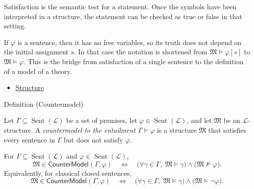 \begin{remark*}[Interpretation]
Satisfaction is the semantic test for a statement. Once the symbols have been
interpreted in a structure, the statement can be checked as true or false in
that setting.
\end{remark*}

\begin{remark*}[Exposition]
If $\varphi$ is a sentence, then it has no free variables, so its truth does
not depend on the initial assignment $s$. In that case the notation is
shortened from $\mathfrak{M}\vDash\varphi[s]$ to $\mathfrak{M}\vDash\varphi$.
This is the bridge from satisfaction of a single sentence to the definition of
a model of a theory.
\end{remark*}

\begin{dependencies}
\begin{itemize}
  \item \hyperref[def:axiom-systems-structure]{Structure}
\end{itemize}
\end{dependencies}

\begin{definitionbox}{Definition (Countermodel)}
\begin{definition}[Countermodel]
\label{def:axiom-systems-countermodel}
Let $\Gamma\subseteq\operatorname{Sent}(\mathcal{L})$ be a set of premises,
let $\varphi\in\operatorname{Sent}(\mathcal{L})$, and let $\mathfrak{M}$ be
an $\mathcal{L}$-structure. A \emph{countermodel to the entailment
$\Gamma\vDash\varphi$} is a structure $\mathfrak{M}$ that satisfies every
sentence in $\Gamma$ but does not satisfy $\varphi$.
\end{definition}
\end{definitionbox}
\begin{remark*}
For $\Gamma\subseteq\operatorname{Sent}(\mathcal{L})$ and
$\varphi\in\operatorname{Sent}(\mathcal{L})$,
\[
  \mathfrak{M}\in\mathsf{CounterModel}(\Gamma,\varphi)
  \quad\Longleftrightarrow\quad
  \bigl(\forall \gamma\in\Gamma,\; \mathfrak{M}\vDash\gamma\bigr)
  \land
  \bigl(\mathfrak{M}\not\vDash\varphi\bigr).
\]
Equivalently, for classical closed sentences,
\[
  \mathfrak{M}\in\mathsf{CounterModel}(\Gamma,\varphi)
  \quad\Longleftrightarrow\quad
  \bigl(\forall \gamma\in\Gamma,\; \mathfrak{M}\vDash\gamma\bigr)
  \land
  \bigl(\mathfrak{M}\vDash\neg\varphi\bigr).
\]
\end{remark*}




